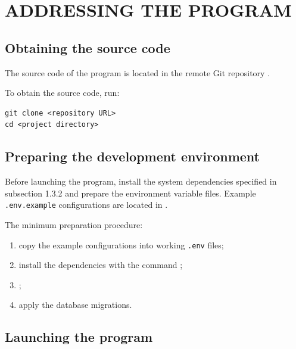 \documentclass[12pt,a4paper]{extarticle}
\begin{document}
\section{ADDRESSING THE PROGRAM}

\subsection{Obtaining the source code}

\begin{hseExample}
The source code of the program is located in the remote Git repository .

To obtain the source code, run:

\begin{verbatim}
git clone <repository URL>
cd <project directory>
\end{verbatim}
\end{hseExample}

\subsection{Preparing the development environment}

\begin{hseExample}
Before launching the program, install the system dependencies specified in subsection 1.3.2 and prepare the environment variable files. Example \texttt{.env.example} configurations are located in .

The minimum preparation procedure:

\begin{enumerate}[label=\arabic*), leftmargin=1.25cm]
    \item copy the example configurations into working \texttt{.env} files;
    \item install the dependencies with the command ;
    \item {};
    \item apply the database migrations.
\end{enumerate}
\end{hseExample}

\subsection{Launching the program}
\end{document}
